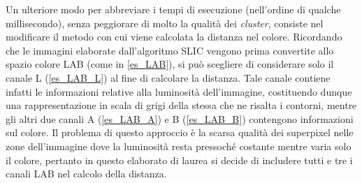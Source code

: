 \documentclass[12pt,a4paper,oneside]{article}
\begin{document}
\noindent Un ulteriore modo per abbreviare i tempi di esecuzione (nell'ordine di qualche millisecondo), senza peggiorare di molto la qualità dei \textit{cluster}, consiste nel modificare il metodo con cui viene calcolata la distanza nel colore. Ricordando che le immagini elaborate dall'algoritmo \gls{SLIC} vengono prima convertite allo spazio colore \mbox{LAB} (come in \cref{es_LAB}), si può scegliere di considerare solo il canale L (\cref{es_LAB_L}) al fine di calcolare la distanza. Tale canale contiene infatti le informazioni relative alla luminosità dell'immagine, costituendo dunque una rappresentazione in scala di grigi della stessa che ne risalta i contorni, mentre gli altri due canali A (\cref{es_LAB_A}) e B (\cref{es_LAB_B}) contengono informazioni sul colore. Il problema di questo approccio è la scarsa qualità dei superpixel nelle zone dell'immagine dove la luminosità resta pressoché costante mentre varia solo il colore, pertanto in questo elaborato di laurea si decide di includere tutti e tre i canali \mbox{LAB} nel calcolo della distanza.
\end{document}
